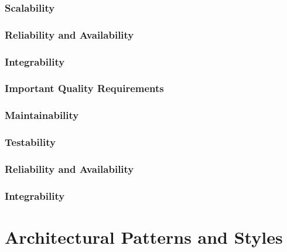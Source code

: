 \documentclass[a4paper,12pt,titlepage]{article}
\begin{document}
		\subsubsection{Scalability}
			
		\subsubsection{Reliability and Availability}
			
		\subsubsection{Integrability}



	\subsubsection{Important Quality Requirements}
			
		\subsubsection{Maintainability}
			
		\subsubsection{Testability}
			
		\subsubsection{Reliability and Availability}
			
		\subsubsection{Integrability}

\section{Architectural Patterns and Styles}
\end{document}
